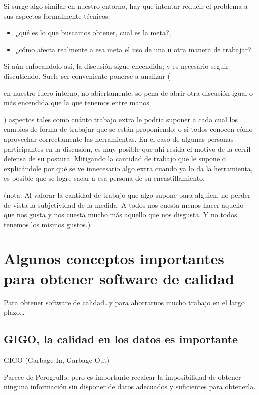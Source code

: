 \documentclass[spanish,12pt,a4paper,final,oneside]{book}
\begin{document}
Si surge algo similar en nuestro entorno, hay que intentar reducir el problema a sus aspectos formalmente técnicos:
\begin{itemize}
\item ¿qué es lo que buscamos obtener, cual es la meta?, 
\item ¿cómo afecta realmente a esa meta el uso de una u otra manera de trabajar?
\end{itemize}

Si aún enfocandolo así, la discusión sigue encendida; y es necesario seguir discutiendo. Suele ser conveniente ponerse a analizar (\begin{footnotesize}en nuestro fuero interno, no abiertamente; so pena de abrir otra discusión igual o más encendida que la que tenemos entre manos\end{footnotesize}) aspectos tales como cuánto trabajo extra le podria suponer a cada cual los cambios de forma de trabajar que se están proponiendo; o si todos conocen cómo aprovechar correctamente las herramientas. En el caso de algunas personas participantes en la discusión, es muy posible que ahí resida el motivo de la cerril defensa de su postura. Mitigando la cantidad de trabajo que le supone o explicándole por qué se ve innecesario algo extra cuando ya lo da la herramienta, es posible que se logre sacar a esa persona de su encastillamiento.

(nota: Al valorar la cantidad de trabajo que algo supone para alguien, no perder de vista la subjetividad de la medida. A todos nos cuesta menos hacer aquello que nos gusta y nos cuesta mucho más aquello que nos disgusta. Y no todos tenemos los mismos gustos.)

\chapter{Algunos conceptos importantes para obtener software de calidad}

Para obtener software de calidad\ldots y para ahorrarnos mucho trabajo en el largo plazo\ldots


\section{GIGO, la calidad en los datos es importante}
GIGO (Garbage In, Garbage Out)

Parece de Perogrullo, pero es importante recalcar la imposibilidad de obtener ninguna información sin disponer de datos adecuados y suficientes para obtenerla. 
\end{document}
